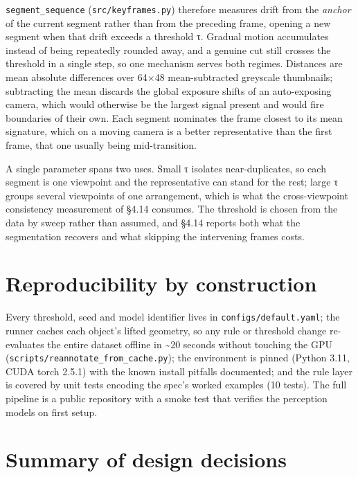\texttt{segment\_sequence} (\texttt{src/keyframes.py}) therefore measures drift from the \textit{anchor} of the current segment rather than from the preceding frame, opening a new segment when that drift exceeds a threshold τ. Gradual motion accumulates instead of being repeatedly rounded away, and a genuine cut still crosses the threshold in a single step, so one mechanism serves both regimes. Distances are mean absolute differences over 64$\times$48 mean-subtracted greyscale thumbnails; subtracting the mean discards the global exposure shifts of an auto-exposing camera, which would otherwise be the largest signal present and would fire boundaries of their own. Each segment nominates the frame closest to its mean signature, which on a moving camera is a better representative than the first frame, that one usually being mid-transition.

A single parameter spans two uses. Small τ isolates near-duplicates, so each segment is one viewpoint and the representative can stand for the rest; large τ groups several viewpoints of one arrangement, which is what the cross-viewpoint consistency measurement of \S4.14 consumes. The threshold is chosen from the data by sweep rather than assumed, and \S4.14 reports both what the segmentation recovers and what skipping the intervening frames costs.

\section{Reproducibility by construction}

Every threshold, seed and model identifier lives in \texttt{configs/default.yaml}; the runner caches each object's lifted geometry, so any rule or threshold change re-evaluates the entire dataset offline in \textasciitilde{}20 seconds without touching the GPU (\texttt{scripts/reannotate\_from\_cache.py}); the environment is pinned (Python 3.11, CUDA torch 2.5.1) with the known install pitfalls documented; and the rule layer is covered by unit tests encoding the spec's worked examples (10 tests). The full pipeline is a public repository with a smoke test that verifies the perception models on first setup.

\section{Summary of design decisions}

